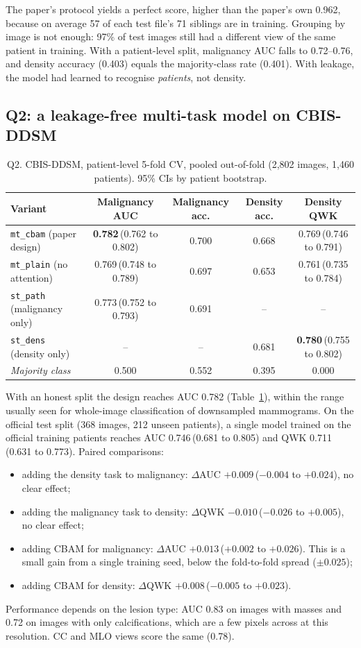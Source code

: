 \documentclass[10pt,a4paper]{article}
\newcommand{\ci}[2]{\,{\footnotesize(#1 to #2)}}
\begin{document}
The paper's protocol yields a perfect score, higher than the paper's own 0.962, because on average 57 of each
test file's 71 siblings are in training. Grouping by image is not enough: 97\% of test images still had a
different view of the same patient in training. With a patient-level split, malignancy AUC falls to 0.72--0.76, and
density accuracy (0.403) equals the majority-class rate (0.401). With leakage, the model had learned to recognise
\emph{patients}, not density.

\subsection{Q2: a leakage-free multi-task model on CBIS-DDSM}\label{sec:cbis}
\begin{table}[h]
\centering\small
\caption{Q2. CBIS-DDSM, patient-level 5-fold CV, pooled out-of-fold (2,802 images, 1,460 patients). 95\% CIs by patient bootstrap.}\label{tab:cbis}
\begin{tabular}{@{}lcccc@{}}
\toprule
Variant & Malignancy AUC & Malignancy acc. & Density acc. & Density QWK \\
\midrule
\texttt{mt\_cbam} (paper design) & \textbf{0.782}\ci{0.762}{0.802} & 0.700 & 0.668 & 0.769\ci{0.746}{0.791} \\
\texttt{mt\_plain} (no attention) & 0.769\ci{0.748}{0.789} & 0.697 & 0.653 & 0.761\ci{0.735}{0.784} \\
\texttt{st\_path} (malignancy only) & 0.773\ci{0.752}{0.793} & 0.691 & -- & -- \\
\texttt{st\_dens} (density only) & -- & -- & 0.681 & \textbf{0.780}\ci{0.755}{0.802} \\
\emph{Majority class} & 0.500 & 0.552 & 0.395 & 0.000 \\
\bottomrule
\end{tabular}
\end{table}

With an honest split the design reaches AUC 0.782 (Table~\ref{tab:cbis}), within the range usually seen for
whole-image classification of downsampled mammograms. On the official test split (368 images, 212 unseen patients),
a single model trained on the official training patients reaches AUC 0.746\ci{0.681}{0.805} and QWK 0.711\ci{0.631}{0.773}.
Paired comparisons:
\begin{itemize}
\item adding the density task to malignancy: $\Delta$AUC $+0.009$\ci{$-0.004$}{$+0.024$}, no clear effect;
\item adding the malignancy task to density: $\Delta$QWK $-0.010$\ci{$-0.026$}{$+0.005$}, no clear effect;
\item adding CBAM for malignancy: $\Delta$AUC $+0.013$\ci{$+0.002$}{$+0.026$}. This is a small gain from a single training seed, below the fold-to-fold spread ($\pm0.025$);
\item adding CBAM for density: $\Delta$QWK $+0.008$\ci{$-0.005$}{$+0.023$}.
\end{itemize}
Performance depends on the lesion type: AUC 0.83 on images with masses and 0.72 on images with only calcifications,
which are a few pixels across at this resolution. CC and MLO views score the same (0.78).
\end{document}
